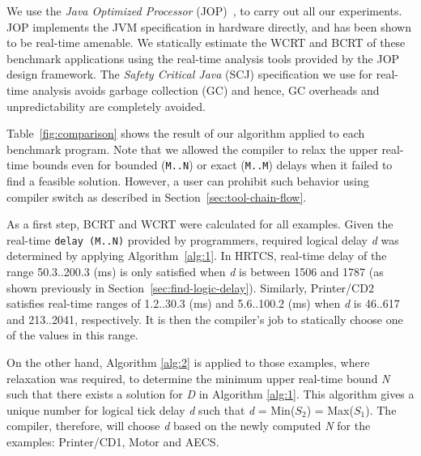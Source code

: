 
We use the \textit{Java Optimized Processor}
(JOP)~\cite{jop:jnl:jsa2007}, to carry out all our experiments. JOP
implements the JVM specification in hardware directly, and has been
shown to be real-time amenable. We statically estimate the WCRT and BCRT
of these benchmark applications using the real-time analysis tools
provided by the JOP design framework. The \textit{Safety Critical Java}
(SCJ) specification we use for real-time analysis avoids garbage
collection (GC) and hence, GC overheads and unpredictability are
completely avoided. 


Table~\ref{fig:comparison} shows the result of our algorithm applied to
each benchmark program. Note that we allowed the compiler to relax the
upper real-time bounds even for bounded (\texttt{M..N}) or exact
(\texttt{M..M}) delays when it failed to find a feasible solution.
However, a user can prohibit such behavior using compiler switch as
described in Section~\ref{sec:tool-chain-flow}.

As a first step, BCRT and WCRT were calculated for all examples. Given
the real-time \mbox{\texttt{delay (M..N)}} provided by programmers,
required logical delay \textit{d} was determined by applying
Algorithm~\ref{alg:1}. In HRTCS, real-time delay of the range
50.3..200.3 (ms) is only satisfied when \emph{d} is between 1506 and
1787 (as shown previously in
Section~\ref{sec:find-logic-delay}). Similarly, Printer/CD2 satisfies
real-time ranges of 1.2..30.3 (ms) and 5.6..100.2 (ms) when \emph{d} is
46..617 and 213..2041, respectively. It is then the compiler's job to
statically choose one of the values in this range.

On the other hand, Algorithm \ref{alg:2} is applied to those examples,
where relaxation was required, to determine the minimum upper real-time
bound \emph{N} such that there exists a solution for \emph{D} in
Algorithm \ref{alg:1}. This algorithm gives a unique number for logical
tick delay \emph{d} such that \emph{d} = Min(\emph{$S_2$}) =
Max(\emph{$S_1$}). The compiler, therefore, will choose \emph{d} based
on the newly computed \emph{N} for the examples: Printer/CD1, Motor and
AECS.

